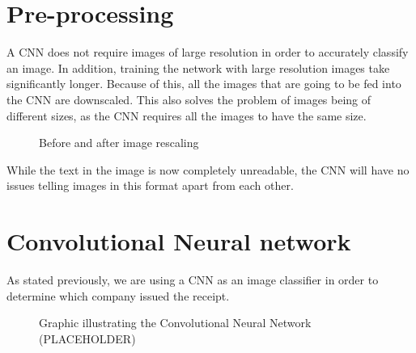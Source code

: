 \section{Pre-processing}\label{sec:pre-processing}
A CNN does not require images of large resolution in order to accurately classify an image.
In addition, training the network with large resolution images take significantly longer.
Because of this, all the images that are going to be fed into the CNN are downscaled.
This also solves the problem of images being of different sizes, as the CNN requires all the images to have the same size.

\begin{figure}[h]
    \caption{Before and after image rescaling}
    \label{fig:figure3.3}
\end{figure}
While the text in the image is now completely unreadable, the CNN will have no issues telling images in this format apart from each other.

\section{Convolutional Neural network}\label{sec:CNN}
As stated previously, we are using a CNN as an image classifier in order to determine which company issued the receipt.

\begin{figure}[h]
    \caption{Graphic illustrating the Convolutional Neural Network (PLACEHOLDER)}
    \label{fig:figure3.4}
\end{figure}

